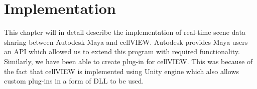 \documentclass[
  digital, %
  table,   %
  nolof,     %
  nolot,     %
]{fithesis3}
\begin{document}

\chapter{Implementation}
\label{chap:implementation}
This chapter will in detail describe the implementation of real-time scene data sharing between Autodesk Maya and cellVIEW. Autodesk provides Maya users an API which allowed us to extend this program with required functionality. Similarly, we have been able to create plug-in for cellVIEW. This was because of the fact that cellVIEW is implemented using Unity engine which also allows custom plug-ins in a form of DLL to be used.
\end{document}
